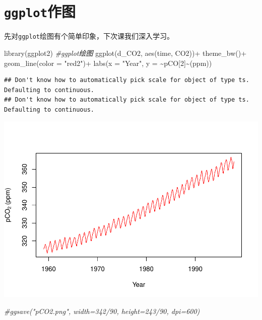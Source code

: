 \documentclass[
]{book}
\newenvironment{Shaded}{\begin{snugshade}}{\end{snugshade}}
\newcommand{\AttributeTok}[1]{\textcolor[rgb]{0.77,0.63,0.00}{#1}}
\newcommand{\CommentTok}[1]{\textcolor[rgb]{0.56,0.35,0.01}{\textit{#1}}}
\newcommand{\DecValTok}[1]{\textcolor[rgb]{0.00,0.00,0.81}{#1}}
\newcommand{\FunctionTok}[1]{\textcolor[rgb]{0.00,0.00,0.00}{#1}}
\newcommand{\NormalTok}[1]{#1}
\newcommand{\SpecialCharTok}[1]{\textcolor[rgb]{0.00,0.00,0.00}{#1}}
\newcommand{\StringTok}[1]{\textcolor[rgb]{0.31,0.60,0.02}{#1}}
\begin{document}
\hypertarget{ggplotux4f5cux56fe}{%
\section{\texorpdfstring{\texttt{ggplot}作图}{ggplot作图}}\label{ggplotux4f5cux56fe}}

先对\texttt{ggplot}绘图有个简单印象，下次课我们深入学习。

\begin{Shaded}
\begin{Highlighting}[]
\FunctionTok{library}\NormalTok{(ggplot2) }\CommentTok{\#ggplot绘图}
\FunctionTok{ggplot}\NormalTok{(d\_CO2, }\FunctionTok{aes}\NormalTok{(time, CO2))}\SpecialCharTok{+}
  \FunctionTok{theme\_bw}\NormalTok{()}\SpecialCharTok{+}
  \FunctionTok{geom\_line}\NormalTok{(}\AttributeTok{color =} \StringTok{"red2"}\NormalTok{)}\SpecialCharTok{+}
  \FunctionTok{labs}\NormalTok{(}\AttributeTok{x =} \StringTok{"Year"}\NormalTok{,}
       \AttributeTok{y =} \SpecialCharTok{\textasciitilde{}}\NormalTok{pCO[}\DecValTok{2}\NormalTok{]}\SpecialCharTok{\textasciitilde{}}\NormalTok{(ppm))}
\end{Highlighting}
\end{Shaded}

\begin{verbatim}
## Don't know how to automatically pick scale for object of type ts. Defaulting to continuous.
## Don't know how to automatically pick scale for object of type ts. Defaulting to continuous.
\end{verbatim}

\includegraphics{bookdown-demo_files/figure-latex/unnamed-chunk-59-1.pdf}

\begin{Shaded}
\begin{Highlighting}[]
\CommentTok{\#ggsave("pCO2.png", width=342/90, height=243/90, dpi=600)}
\end{Highlighting}
\end{Shaded}
\end{document}
